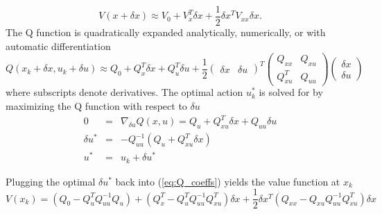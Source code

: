 \documentclass[10 pt]{article}
\begin{document}
\begin{equation}
V(x+\delta x) \approx V_0 + V_x^T\delta x + \frac{1}{2}\delta x^T V_{xx} \delta x.
\end{equation}
The Q function is quadratically expanded analytically, numerically, or with automatic differentiation
\begin{equation}
\label{eq:Q_coeffs}
Q(x_k+\delta x,u_k+\delta u) \approx Q_0 +Q_x^T\delta x +Q_u^T\delta u+
\frac{1}{2}
(\begin{array}{rr}\delta x & \delta u\end{array})^T
\left(\begin{array}{rr}Q_{xx} & Q_{xu}\\Q_{xu}^T & Q_{uu}\end{array}\right)
\left(\begin{array}{rr}\delta x \\ \delta u\end{array}\right)
\end{equation}
where subscripts denote derivatives. The optimal action $u_k^*$ is solved for by maximizing the Q function with respect to $\delta u$
\begin{eqnarray*}
0 &=& \nabla_{\delta u}Q(x,u) = Q_u + Q_{xu}^T\delta x + Q_{uu}\delta u\\
\delta u^* &=& -Q_{uu}^{-1}(Q_u+Q_{xu}^T\delta x)\\
u^* &=& u_k + \delta u^*
\end{eqnarray*}

Plugging the optimal $\delta u^*$ back into (\ref{eq:Q_coeffs}) yields the value function at $x_k$
\[
V(x_k)=\left(Q_0-Q_u^TQ_{uu}^{-1}Q_u\right)+\left(Q_x^T-Q_u^TQ_{uu}^{-1}Q_{xu}^T\right)\delta x+\frac{1}{2}\delta x^T\left(Q_{xx}-Q_{xu}Q_{uu}^{-1}Q_{xu}^T\right)\delta x
\]
\end{document}
